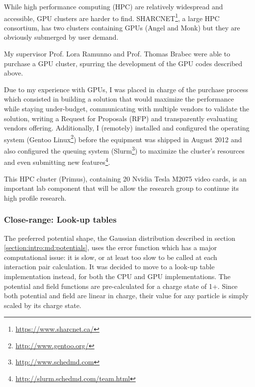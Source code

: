 
While high performance computing (HPC) are relatively widespread and accessible,
GPU clusters are harder to find.
SHARCNET\footnote{\url{https://www.sharcnet.ca/}}, a large HPC
consortium, has two clusters containing GPUs (Angel and Monk) but they are
obviously submerged by user demand.


My supervisor Prof. Lora Ramunno and Prof. Thomas Brabec were able to purchase 
a GPU cluster, spurring the development of the GPU codes described above.

Due to my experience with GPUs, I was placed in charge of the purchase process
which consisted in building a solution that would maximize the performance
while staying under-budget, communicating with multiple vendors to validate
the solution, writing a Request for Proposals (RFP) and transparently evaluating
vendors offering. Additionally, I (remotely) installed and configured the
operating system (Gentoo Linux\footnote{\url{http://www.gentoo.org/}}) before
the equipment was shipped in August 2012 and also configured the queuing system
(Slurm\footnote{\url{http://www.schedmd.com}}) to maximize the cluster's
resources and even submitting new
features\footnote{\url{http://slurm.schedmd.com/team.html}}.

This HPC cluster (Primus), containing 20 Nvidia Tesla M2075 video cards, is an important
lab component that will be allow the research group to continue its high profile
research.



\subsubsection{Close-range: Look-up tables}
\label{section:intro:lut}

The preferred potential shape, the Gaussian distribution described in section
\ref{section:intro:md:potentials}, uses the error function which has a major
computational issue: it is slow, or at least too slow to be called at each interaction pair
calculation. It was decided to move to a look-up table implementation instead,
for both the CPU and GPU implementations.
The potential and field functions are pre-calculated for a charge state of 1+.
Since both potential and field are linear in charge, their value for any
particle is simply scaled by its charge state.

